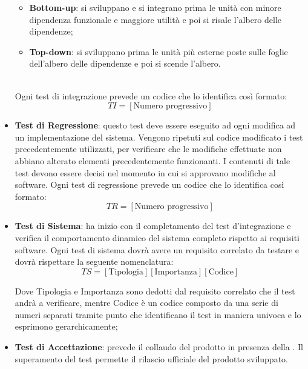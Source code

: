 \begin{itemize}
                            \begin{itemize}
                                \item \textbf{Bottom-up}: si sviluppano e si integrano prima le unità con minore
                                dipendenza funzionale e maggiore utilità e poi si risale l'albero delle
                                dipendenze;
                                \item \textbf{Top-down}: si sviluppano prima le unità più esterne poste sulle
                                foglie dell'albero delle dipendenze e poi si scende l'albero.
                            \end{itemize}\\
						Ogni test di integrazione prevede un codice che lo identifica così formato:
						\[TI = [\mbox{Numero progressivo}]\]
                    \item \textbf{Test di Regressione}:
                        questo test deve essere eseguito ad ogni modifica ad un implementazione del sistema.
                        Vengono ripetuti sul codice modificato i test precedentemente utilizzati, per
                        verificare che le modifiche effettuate non abbiano alterato elementi precedentemente
                        funzionanti.
                        I contenuti di tale test devono essere decisi nel momento in cui si approvano modifiche
                        al software.
                        Ogni test di regressione prevede un codice che lo identifica così formato:
						\[TR = [\mbox{Numero progressivo}]\]
                    \item \textbf{Test di Sistema}:
                        ha inizio con il completamento del test d'integrazione e verifica il comportamento
                        dinamico del sistema completo rispetto ai requisiti software.
                        Ogni test di sistema dovrà avere un requisito correlato da testare e dovrà rispettare 
                        la seguente nomenclatura:
                        \[TS = [\mbox{Tipologia}][\mbox{Importanza}][\mbox{Codice}]\]
                                               
                        Dove Tipologia e Importanza sono dedotti dal requisito correlato che il test andrà a verificare, 
                        mentre Codice è un codice composto da una serie di numeri separati tramite
                   		punto che identificano il test in maniera univoca e lo esprimono gerarchicamente;
                    \item \textbf{Test di Accettazione}:
                        prevede il collaudo del prodotto in presenza della .
                        Il superamento del test permette il rilascio ufficiale del prodotto sviluppato.
                        
                \end{itemize}
		
